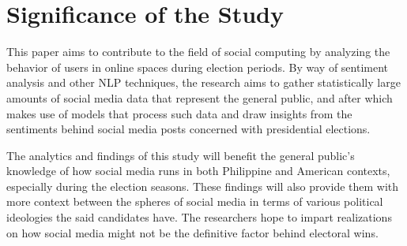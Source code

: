 \section{Significance of the Study}
This paper aims to contribute to the field of social computing by analyzing the behavior of users in online spaces during election periods. By way of sentiment analysis and other NLP techniques, the research aims to gather statistically large amounts of social media data that represent the general public, and after which makes use of models that process such data and draw insights from the sentiments behind social media posts concerned with presidential elections. 

The analytics and findings of this study will benefit the general public's knowledge of how social media runs in both Philippine and American contexts, especially during the election seasons. These findings will also provide them with more context between the spheres of social media in terms of various political ideologies the said candidates have. The researchers hope to impart realizations on how social media might not be the definitive factor behind electoral wins.
